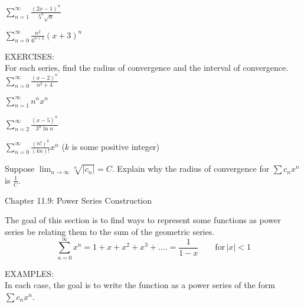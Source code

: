 \documentclass[11pt]{article}
\begin{document}
 
 \vspace{3in}


 $\sum_{n=1}^{\infty} \frac{(2x-1)^n}{5^n\sqrt{n}}$

 \vspace{3in}

 $\sum_{n=0}^{\infty} \frac{n^2}{6^{n+2}}(x+3)^n $

\pagebreak

EXERCISES:\\

For each series, find the radius of convergence and the interval of convergence.\\


 $\sum_{n=0}^{\infty} \frac{(x-2)^n}{n^2+4} $

  \vspace{1.5in}
  
    $\sum_{n=1}^{\infty} n^nx^n$  

  \vspace{1.5in}
  
    $\sum_{n=2}^{\infty} \frac{(x-5)^n}{3^n\ln{n}}$  


    \vspace{1.5in}
  
    $\sum_{n=0}^{\infty} \frac{(n!)^k}{(kn)!}x^n$ \quad ($k$ is some positive integer)  


    \vspace{1in}
    Suppose $\lim_{n\to\infty}\sqrt[n]{|c_n|}=C$.  Explain why the radius of convergence for $\sum c_nx^n$ is $\frac1C$.

    \pagebreak
    
\begin{center}
\Large
\rm{Chapter 11.9:  Power Series Construction}
\\
\end{center}
\vspace{0.5in}

The goal of this section is to find ways to represent some functions as power series be relating them
to the sum of the geometric series.
\begin{displaymath}
\sum_{n=0}^{\infty}x^n = 1 + x + x^2 + x^3 + .... = \frac{1}{1-x} \quad\quad \mbox{for} \,|x|< 1
  \end{displaymath}

\vspace{.2in}

EXAMPLES:\\


In each case, the goal is to write the function as a power series of the form $\sum c_nx^n$.\\
\end{document}
